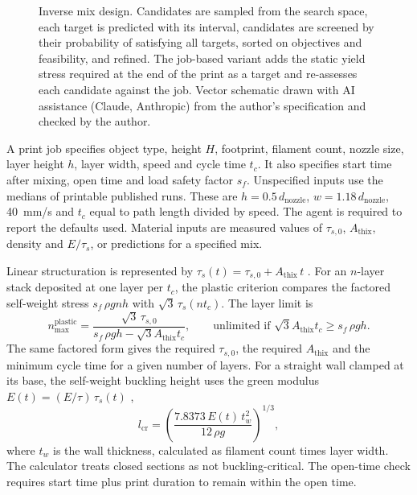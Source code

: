 \documentclass[preprint,12pt]{elsarticle}
\newcommand{\aidisclosure}{Vector schematic drawn with AI assistance (Claude, Anthropic) from the author's specification and checked by the author.}
\begin{document}
\begin{figure}[t]
\centering
\resizebox{\textwidth}{!}{}
\caption{Inverse mix design. Candidates are sampled from the search space, each target is predicted with its interval, candidates are screened by their probability of satisfying all targets, sorted on objectives and feasibility, and refined. The job-based variant adds the static yield stress required at the end of the print as a target and re-assesses each candidate against the job. \aidisclosure}
\label{fig:inverse}
\end{figure}

A print job specifies object type, height $H$, footprint, filament count, nozzle size, layer height $h$, layer width, speed and cycle time $t_c$. It also specifies start time after mixing, open time and load safety factor $s_f$. Unspecified inputs use the medians of printable published runs. These are $h = 0.5\,d_{\mathrm{nozzle}}$, $w = 1.18\,d_{\mathrm{nozzle}}$, 40~mm/s and $t_c$ equal to path length divided by speed. The agent is required to report the defaults used. Material inputs are measured values of $\tau_{s,0}$, $A_{\mathrm{thix}}$, density and $E/\tau_s$, or predictions for a specified mix.

Linear structuration is represented by $\tau_s(t) = \tau_{s,0} + A_{\mathrm{thix}}\, t$ \cite{perrot2016structural,roussel2018rheological}. For an $n$-layer stack deposited at one layer per $t_c$, the plastic criterion compares the factored self-weight stress $s_f\,\rho g n h$ with $\sqrt{3}\,\tau_s(n t_c)$. The layer limit is
\begin{equation}
n_{\max}^{\mathrm{plastic}} = \frac{\sqrt{3}\,\tau_{s,0}}{s_f\,\rho g h - \sqrt{3} A_{\mathrm{thix}} t_c},
\qquad \text{unlimited if } \sqrt{3} A_{\mathrm{thix}} t_c \ge s_f\,\rho g h .
\label{eq:plastic}
\end{equation}
The same factored form gives the required $\tau_{s,0}$, the required $A_{\mathrm{thix}}$ and the minimum cycle time for a given number of layers.
For a straight wall clamped at its base, the self-weight buckling height uses the green modulus $E(t) = (E/\tau)\,\tau_s(t)$ \cite{suiker2018mechanical},
\begin{equation}
l_{\mathrm{cr}} = \left( \frac{7.8373\, E(t)\, t_w^2}{12\, \rho g} \right)^{1/3},
\label{eq:buckling}
\end{equation}
where $t_w$ is the wall thickness, calculated as filament count times layer width. The calculator treats closed sections as not buckling-critical. The open-time check requires start time plus print duration to remain within the open time.
\end{document}
